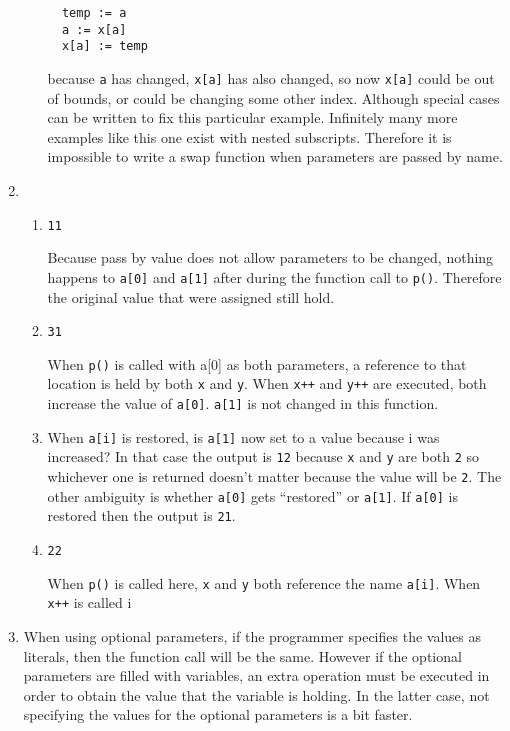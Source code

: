 \begin{enumerate}
\begin{enumerate}
{\begin{verbatim}
  temp := a
  a := x[a]
  x[a] := temp
\end{verbatim}

}

  because {\tt a} has changed, {\tt x[a]} has also changed, so now {\tt x[a]} could be out of
  bounds, or could be changing some other index.  Although special cases can be written to
  fix this particular example.  Infinitely many more examples like this one exist with nested
  subscripts.  Therefore it is impossible to write a swap function when parameters are passed
  by name.
\end{enumerate}

\item %

\begin{enumerate}
\item {\tt 11}

  Because pass by value does not allow parameters to be changed, nothing happens to {\tt a[0]}
  and {\tt a[1]} after during the function call to {\tt p()}.  Therefore the original value that
  were assigned still hold.

\item {\tt 31}
  
  When {\tt p()} is called with a[0] as both parameters, a reference to that location is held by
  both {\tt x} and {\tt y}.  When {\tt x++} and {\tt y++} are executed, both increase the value
  of {\tt a[0]}.  {\tt a[1]} is not changed in this function.

\item
  
  When {\tt a[i]} is restored, is {\tt a[1]} now set to a value because i was increased?  In
  that case the output is {\tt 12} because {\tt x} and {\tt y} are both {\tt 2} so whichever one
  is returned doesn't matter because the value will be {\tt 2}.  The other ambiguity is whether
  {\tt a[0]} gets ``restored'' or {\tt a[1]}.  If {\tt a[0]} is restored then the output is
  {\tt 21}.

\item {\tt 22}

  When {\tt p()} is called here, {\tt x} and {\tt y} both reference the name {\tt a[i]}.  When
  {\tt x++} is called i

\end{enumerate}

\item %

When using optional parameters, if the programmer specifies the values as literals, then the
function call will be the same.  However if the optional parameters are filled with variables,
an extra operation must be executed in order to obtain the value that the variable is holding.
In the latter case, not specifying the values for the optional parameters is a bit faster.

\end{enumerate}
